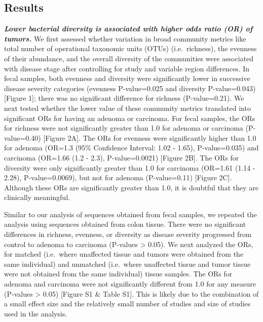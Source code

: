 \documentclass[12pt,]{article}
\begin{document}
\newpage

\subsection{Results}\label{results}

\textbf{\emph{Lower bacterial diversity is associated with higher odds
ratio (OR) of tumors.}} We first assessed whether variation in broad
community metrics like total number of operational taxonomic units
(OTUs) (i.e.~richness), the evenness of their abundance, and the overall
diversity of the communities were associated with disease stage after
controlling for study and variable region differences. In fecal samples,
both evenness and diversity were significantly lower in successive
disease severity categories (evenness P-value=0.025 and diversity
P-value=0.043) {[}Figure 1{]}; there was no significant difference for
richness (P-value=0.21). We next tested whether the lower value of these
community metrics translated into significant ORs for having an adenoma
or carcinoma. For fecal samples, the ORs for richness were not
significantly greater than 1.0 for adenoma or carcinoma (P-value=0.40)
{[}Figure 2A{]}. The ORs for evenness were significantly higher than 1.0
for adenoma (OR=1.3 (95\% Confidence Interval: 1.02 - 1.65),
P-value=0.035) and carcinoma (OR=1.66 (1.2 - 2.3), P-value=0.0021)
{[}Figure 2B{]}. The ORs for diversity were only significantly greater
than 1.0 for carcinoma (OR=1.61 (1.14 - 2.28), P-value=0.0069), but not
for adenoma (P-value=0.11) {[}Figure 2C{]}. Although these ORs are
significantly greater than 1.0, it is doubtful that they are clinically
meaningful.

Similar to our analysis of sequences obtained from fecal samples, we
repeated the analysis using sequences obtained from colon tissue. There
were no significant differences in richness, evenness, or diversity as
disease severity progressed from control to adenoma to carcinoma
(P-values \textgreater{} 0.05). We next analyzed the ORs, for matched
(i.e.~where unaffected tissue and tumors were obtained from the same
individual) and unmatched (i.e.~where unaffected tissue and tumor tissue
were not obtained from the same individual) tissue samples. The ORs for
adenoma and carcinoma were not significantly different from 1.0 for any
measure (P-values \textgreater{} 0.05) {[}Figure S1 \& Table S1{]}. This
is likely due to the combination of a small effect size and the
relatively small number of studies and size of studies used in the
analysis.
\end{document}
